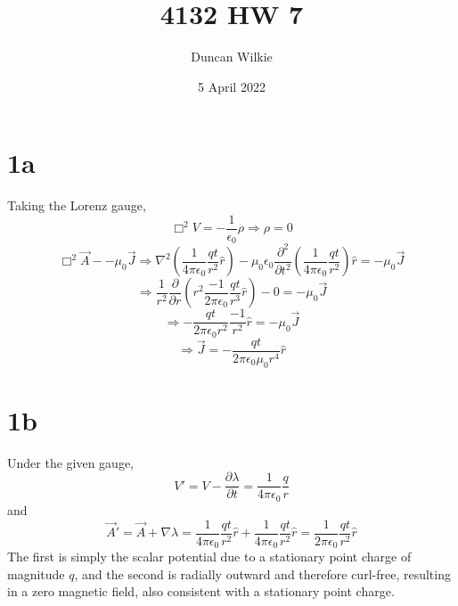 \documentclass{article}
\title{4132 HW 7}
\author{Duncan Wilkie}
\date{5 April 2022}
\begin{document}
\maketitle

\section*{1a}
Taking the Lorenz gauge,
\[\Box^{2}V=-\frac{1}{\epsilon_{0}}\rho \Rightarrow \rho=0\]
\[
  \Box^{2}\vec{A}--\mu_{0}\vec{J}
  \Rightarrow \nabla^{2}\left( \frac{1}{4\pi\epsilon_{0}}\frac{qt}{r^{2}}\hat{r} \right)-\mu_{0}\epsilon_{0}\frac{\partial^{2}}{\partial t^{2}}\left( \frac{1}{4\pi\epsilon_{0}}\frac{qt}{r^{2}} \right)\hat{r}=-\mu_{0}\vec{J}
\]
\[
  \Rightarrow \frac{1}{r^{2}}\frac{\partial}{\partial r}\left( r^{2}\frac{-1}{2\pi\epsilon_{0}}\frac{qt}{r^{3}}\hat{r} \right)
  -0 = -\mu_{0}\vec{J}
\]
\[
  \Rightarrow -\frac{qt}{2\pi\epsilon_{0}r^{2}}\frac{-1}{r^{2}}\hat{r}=-\mu_{0}\vec{J}
\]
\[
  \Rightarrow \vec{J}=-\frac{qt}{2\pi\epsilon_{0}\mu_{0}r^{4}}\hat{r}
\]

\section*{1b}
Under the given gauge,
\[
  V'=V-\frac{\partial \lambda}{\partial t}
  =\frac{1}{4\pi\epsilon_{0}}\frac{q}{r}
\]
and
\[
  \vec{A}'=\vec{A}+\nabla\lambda
  =\frac{1}{4\pi\epsilon_{0}}\frac{qt}{r^{2}}\hat{r}+\frac{1}{4\pi\epsilon_{0}}\frac{qt}{r^{2}}\hat{r}
  =\frac{1}{2\pi\epsilon_{0}}\frac{qt}{r^{2}}\hat{r}
\]
The first is simply the scalar potential due to a stationary point charge of magnitude $q$,
and the second is radially outward and therefore curl-free, resulting in a zero magnetic field,
also consistent with a stationary point charge.
\end{document}
